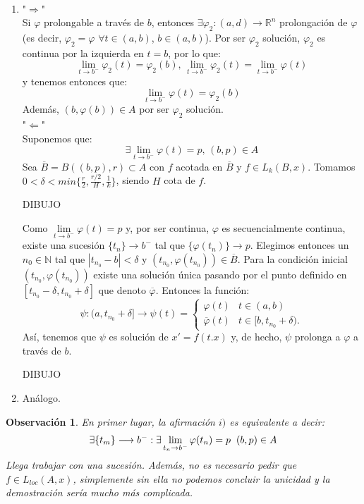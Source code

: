 \documentclass[11pt]{article}
\makeatletter
\theoremstyle{theorem-style}  %
\renewenvironment{proof}[1][\proofname]{\par
	\pushQED{\qed}%
	\normalfont \topsep6\p@\@plus6\p@\relax
	\list{}{%
		\settowidth{\leftmargin}{\quad:\hskip\labelsep}%
		\setlength{\labelwidth}{0pt}%
		\setlength{\itemindent}{-\leftmargin}%
	}%
	\item[\hskip\labelsep\itshape#1\@addpunct{:}]\ignorespaces
}{%
	\popQED\endlist\@endpefalse
}
\theoremstyle{definition-style}
\newtheorem*{observation}{Observación} %
\theoremstyle{example-style}
\providecommand{\abs}[1]{\left\lvert#1\right\rvert} %
\makeatother
\begin{document}
\begin{proof}\ 
	\begin{enumerate} [\quad i)]
		\item "$\Rightarrow$" \\
		Si $\varphi$ prolongable a través de $b$, entonces $\exists \varphi_2 : (a, d) \longrightarrow \mathbb{R}^n$ prolongación de $\varphi$ (es decir, $\varphi_2 = \varphi$ $\forall t \in (a, b)$, $b \in (a, b)$). Por ser $\varphi_2$ solución, $\varphi_2$ es continua por la izquierda en $t = b$, por lo que:
		\[\lim\limits_{t \to b^-} \varphi_2(t) = \varphi_2(b) \text{, } \lim\limits_{t \to b^-} \varphi_2(t) = \lim\limits_{t \to b^-} \varphi(t)\]
		y tenemos entonces que:
		\[\lim\limits_{t \to b^-} \varphi(t) = \varphi_2(b)\]
		Además, $(b, \varphi(b)) \in A$ por ser $\varphi_2$ solución. \\
		"$\Leftarrow$" \\
		Suponemos que:
		\[\exists \lim\limits_{t \to b^-} \varphi(t) = p \text{, } (b, p) \in A\]
		Sea $\overline{B} = B((b, p), r) \subset A$ con $f$ acotada en $\overline{B}$ y $f \in L_k (B, x)$. Tomamos $0 < \delta < min\{\frac{r}{2}, \frac{r/2}{H}, \frac{1}{k}\}$, siendo $H$ cota de $f$.
		
		DIBUJO
		
		Como $\lim\limits_{t \to b^-} \varphi (t) = p$ y, por ser continua, $ \varphi $ es secuencialmente continua, existe una sucesión $\{t_n\} \longrightarrow b^-$ tal que $\{\varphi(t_n)\} \longrightarrow p$. Elegimos entonces un $n_0 \in \mathbb{N}$ tal que $\abs{t_{n_0} - b} < \delta$ y $(t_{n_0}, \varphi (t_{n_0})) \in \overline{B}$. Para la condición inicial $(t_{n_0}, \varphi (t_{n_0}))$ existe una solución única pasando por el punto definido en $[t_{n_0} - \delta, t_{n_0} + \delta]$ que denoto $\overline{\varphi}$. Entonces la función:
		\[\psi: (a, t_{n_0} + \delta] \longrightarrow \psi (t) = \begin{cases}
		\varphi(t) &t \in (a, b) \\ 
		\overline{\varphi} (t) &t \in [b, t_{n_0} + \delta).
		\end{cases}\]
		Así, tenemos que $\psi$ es solución de $x' = f(t. x)$ y, de hecho, $\psi$ prolonga a $\varphi$ a través de $b$.
		
		DIBUJO
		\item Análogo.
	\end{enumerate} 
\end{proof}
\begin{observation}
	En primer lugar, la afirmación $i)$ es equivalente a decir:
	\[\exists \{t_m\} \longrightarrow b^- : \exists \lim\limits_{t_n \to b^-} \varphi(t_n) = p \hspace{0.2cm} (b, p) \in A\]
	Llega trabajar con una sucesión. Además, no es necesario pedir que $f \in L_{loc}(A, x)$, simplemente sin ella no podemos concluir la unicidad y la demostración sería mucho más complicada.
\end{observation}
\end{document}
